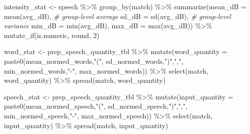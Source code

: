 \documentclass[
]{article}
\newenvironment{Shaded}{\begin{snugshade}}{\end{snugshade}}
\newcommand{\AttributeTok}[1]{\textcolor[rgb]{0.77,0.63,0.00}{#1}}
\newcommand{\CommentTok}[1]{\textcolor[rgb]{0.56,0.35,0.01}{\textit{#1}}}
\newcommand{\DecValTok}[1]{\textcolor[rgb]{0.00,0.00,0.81}{#1}}
\newcommand{\FunctionTok}[1]{\textcolor[rgb]{0.00,0.00,0.00}{#1}}
\newcommand{\NormalTok}[1]{#1}
\newcommand{\OtherTok}[1]{\textcolor[rgb]{0.56,0.35,0.01}{#1}}
\newcommand{\SpecialCharTok}[1]{\textcolor[rgb]{0.00,0.00,0.00}{#1}}
\newcommand{\StringTok}[1]{\textcolor[rgb]{0.31,0.60,0.02}{#1}}
\begin{document}
\begin{Shaded}
\begin{Highlighting}[]
\NormalTok{intensity\_stat }\OtherTok{\textless{}{-}}\NormalTok{ speech }\SpecialCharTok{\%\textgreater{}\%}
  \FunctionTok{group\_by}\NormalTok{(match) }\SpecialCharTok{\%\textgreater{}\%}
  \FunctionTok{summarize}\NormalTok{(}\AttributeTok{mean\_dB =} \FunctionTok{mean}\NormalTok{(avg\_dB), }\CommentTok{\# group{-}level average}
            \AttributeTok{sd\_dB =} \FunctionTok{sd}\NormalTok{(avg\_dB), }\CommentTok{\# group{-}level variance}
            \AttributeTok{min\_dB =} \FunctionTok{min}\NormalTok{(avg\_dB),}
            \AttributeTok{max\_dB =} \FunctionTok{max}\NormalTok{(avg\_dB)) }\SpecialCharTok{\%\textgreater{}\%}
  \FunctionTok{mutate\_if}\NormalTok{(is.numeric, round, }\DecValTok{2}\NormalTok{)}

\NormalTok{word\_stat }\OtherTok{\textless{}{-}}\NormalTok{ prep\_speech\_quantity\_tbl }\SpecialCharTok{\%\textgreater{}\%}
  \FunctionTok{mutate}\NormalTok{(}\AttributeTok{word\_quantity =} \FunctionTok{paste0}\NormalTok{(mean\_normed\_words,}\StringTok{"("}\NormalTok{,}
\NormalTok{                                sd\_normed\_words,}\StringTok{")"}\NormalTok{,}\StringTok{","}\NormalTok{,}
\NormalTok{                                min\_normed\_words,}\StringTok{"{-}"}\NormalTok{,}
\NormalTok{                                max\_normed\_words)) }\SpecialCharTok{\%\textgreater{}\%}
  \FunctionTok{select}\NormalTok{(match, word\_quantity) }\SpecialCharTok{\%\textgreater{}\%}
  \FunctionTok{spread}\NormalTok{(match, word\_quantity)}

\NormalTok{speech\_stat }\OtherTok{\textless{}{-}}\NormalTok{ prep\_speech\_quantity\_tbl }\SpecialCharTok{\%\textgreater{}\%}
  \FunctionTok{mutate}\NormalTok{(}\AttributeTok{input\_quantity =} \FunctionTok{paste0}\NormalTok{(mean\_normed\_speech,}\StringTok{"("}\NormalTok{,}
\NormalTok{                                 sd\_normed\_speech,}\StringTok{")"}\NormalTok{,}\StringTok{","}\NormalTok{,}
\NormalTok{                                 min\_normed\_speech,}\StringTok{"{-}"}\NormalTok{,}
\NormalTok{                                 max\_normed\_speech)) }\SpecialCharTok{\%\textgreater{}\%}
  \FunctionTok{select}\NormalTok{(match, input\_quantity) }\SpecialCharTok{\%\textgreater{}\%}
  \FunctionTok{spread}\NormalTok{(match, input\_quantity)}


\end{Highlighting}
\end{Shaded}
\end{document}
